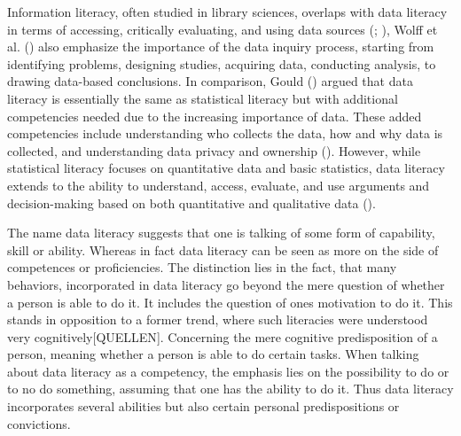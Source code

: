 \documentclass[
  12pt,
  a4paper,
  twoside]{article}
\begin{document}
Information literacy, often studied in library sciences, overlaps with
data literacy in terms of accessing, critically evaluating, and using
data sources (;
), Wolff et al.
() also emphasize the importance of the
data inquiry process, starting from identifying problems, designing
studies, acquiring data, conducting analysis, to drawing data-based
conclusions. In comparison, Gould ()
argued that data literacy is essentially the same as statistical
literacy but with additional competencies needed due to the increasing
importance of data. These added competencies include understanding who
collects the data, how and why data is collected, and understanding data
privacy and ownership (). However,
while statistical literacy focuses on quantitative data and basic
statistics, data literacy extends to the ability to understand, access,
evaluate, and use arguments and decision-making based on both
quantitative and qualitative data ().

The name data literacy suggests that one is talking of some form of
capability, skill or ability. Whereas in fact data literacy can be seen
as more on the side of competences or proficiencies. The distinction
lies in the fact, that many behaviors, incorporated in data literacy go
beyond the mere question of whether a person is able to do it. It
includes the question of ones motivation to do it. This stands in
opposition to a former trend, where such literacies were understood very
cognitively{[}QUELLEN{]}. Concerning the mere cognitive predisposition
of a person, meaning whether a person is able to do certain tasks. When
talking about data literacy as a competency, the emphasis lies on the
possibility to do or to no do something, assuming that one has the
ability to do it. Thus data literacy incorporates several abilities but
also certain personal predispositions or convictions.
\end{document}

